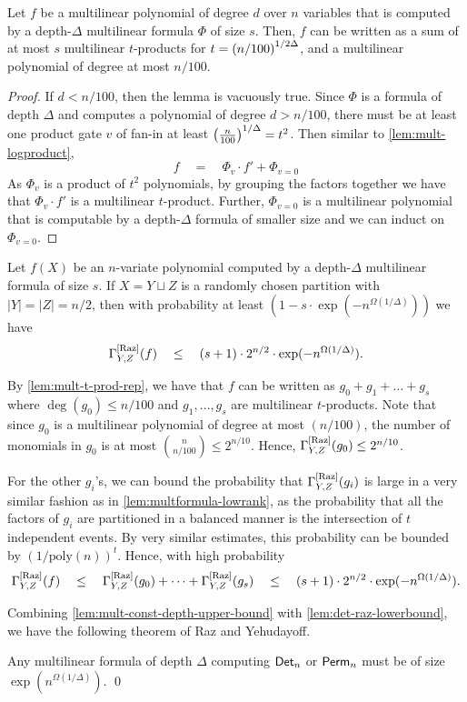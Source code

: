 \begin{lemma}\label{lem:mult-t-prod-rep}
Let $f$ be a multilinear polynomial of degree $d$ over $n$ variables that is computed by a depth-$\Delta$ multilinear formula $\Phi$ of size $s$. 
Then, $f$ can be written as a sum of at most $s$ multilinear $t$-products for $t = \left(n/100\right)^{1/2\Delta}$, and a multilinear polynomial of degree at most $n/100$.  
\end{lemma}
\begin{proof}
If $d < n/100$, then the lemma is vacuously true. 
Since $\Phi$ is a formula of depth $\Delta$ and computes a polynomial of degree $d > n/100$, there must be at least one product gate $v$ of fan-in at least $\left(\frac{n}{100}\right)^{1/\Delta} = t^2$. 
Then similar to \autoref{lem:mult-logproduct}, 
$$
f \quad=\quad \Phi_v \cdot f'  + \Phi_{v=0}
$$
As $\Phi_v$ is a product of $t^2$ polynomials, by grouping the factors together we have that $\Phi_v \cdot f'$ is a multilinear $t$-product. 
Further, $\Phi_{v=0}$ is a multilinear polynomial that is computable by a depth-$\Delta$ formula of smaller size and we can induct on $\Phi_{v=0}$. 
\end{proof}

\begin{lemma}\label{lem:mult-const-depth-upper-bound}
Let $f(X)$ be an $n$-variate polynomial computed by a depth-$\Delta$ multilinear formula of size $s$. 
If $X = Y \sqcup Z$ is a randomly chosen partition with $|Y| = |Z| = n/2$, then with probability at least $(1 - s \cdot \exp({-n^{\Omega(1/\Delta)}}))$ we have
$$
\Gamma^{\mathrm{[Raz]}}_{Y,Z}(f) \quad\leq\quad (s+1) \cdot 2^{n/2} \cdot \exp(-n^{\Omega(1/\Delta)}).
$$
\end{lemma}
\begin{proof-sketch}
By \autoref{lem:mult-t-prod-rep}, we have that $f$ can be written as $g_0 + g_1 + \dots + g_s$ where $\deg(g_0) \leq n/100$ and $g_1,\dots, g_s$ are multilinear $t$-products. 
Note that since $g_0$ is a multilinear polynomial of degree at most $(n/100)$, the number of monomials in $g_0$ is at most $\binom{n}{n/100} \leq 2^{n/10}$. 
Hence, $\Gamma^{\mathrm{[Raz]}}_{Y,Z}(g_0) \leq 2^{n/10}$. 

For the other $g_i$'s, we can bound the probability that $\Gamma^{\mathrm{[Raz]}}_{Y,Z}(g_i)$ is large in a very similar fashion as in \autoref{lem:multformula-lowrank}, as the probability that all the factors of $g_i$ are partitioned in a balanced manner is the intersection of $t$ independent events. 
By very similar estimates, this probability can be bounded by $(1/\mathrm{poly}(n))^t$. 
Hence, with high probability 
$$
\Gamma^{\mathrm{[Raz]}}_{Y,Z}(f) \quad \leq \quad \Gamma^{\mathrm{[Raz]}}_{Y,Z}(g_0) + \dots + \Gamma^{\mathrm{[Raz]}}_{Y,Z}(g_s) \quad \leq \quad (s+1)\cdot 2^{n/2} \cdot \exp(-n^{\Omega(1/\Delta)}).
$$
\end{proof-sketch}

Combining \autoref{lem:mult-const-depth-upper-bound} with \autoref{lem:det-raz-lowerbound}, we have the following theorem of Raz and Yehudayoff. 

\begin{theorem}
Any multilinear formula of depth $\Delta$ computing $\operatorname{\mathsf{Det}}_n$ or $\operatorname{\mathsf{Perm}}_n$ must be of size $\exp(n^{\Omega(1/\Delta)})$.  \qed
\end{theorem}
